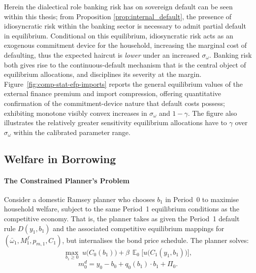 \documentclass[11pt]{article}
\DeclareMathOperator{\E}{\mathbb{E}}
\theoremstyle{definition}
\theoremstyle{plain}
\theoremstyle{remark}
\begin{document}
Herein the dialectical role banking risk has on sovereign default can be seen within this thesis; from Proposition \ref{prop:internal_default}, the presence of idiosyncratic risk within the banking sector is necessary to admit partial default in equilibrium. Conditional on this equilibrium, idiosyncratic risk acts as an exogenous commitment device for the household, increasing the marginal cost of defaulting, thus the expected haircut is \textit{lower} under an increased $\sigma_{\omega}$. Banking risk both gives rise to the continuous-default mechanism that is the central object of equilibrium allocations, and disciplines its severity at the margin. Figure~\ref{fig:comp-stat-efp-imports} reports the general equilibrium values of the external finance premium and import compression, offering quantitative confirmation of the commitment-device nature that default costs possess; exhibiting monotone  visibly convex increases in $\sigma_{\omega}$ and $1-\gamma$. The figure also illustrates the relatively greater sensitivity equilibrium allocations have to $\gamma$ over $\sigma_{\omega}$ within the calibrated parameter range.

\subsection{Welfare in Borrowing}

\paragraph{The Constrained Planner's Problem}\label{sec:planner}

Consider a domestic Ramsey planner who chooses $b_1$ in Period~0 to maximise household welfare, subject to the same Period~1 equilibrium conditions as the competitive economy. That is, the planner takes as given the Period~1 default rule $D(y_1, b_1)$ and the associated competitive equilibrium mappings for $(\bar{\omega}_1, M^f_1, p_{m,1}, C_1)$, but internalises the bond price schedule.
The planner solves:
\begin{equation}\label{eq:planner}
    \max_{b_1 \geq 0} \; u\!\bigl(C_0(b_1)\bigr) + \beta\,\E_0\!\bigl[u\!\bigl(C_1(y_1, b_1)\bigr)\bigr],
\end{equation}
\[
    m^d_0 = y_0 - b_0 + q_0(b_1)\cdot b_1 + \Pi_0.
\]
\end{document}

